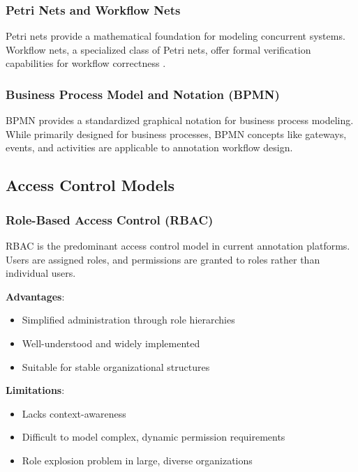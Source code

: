 \subsubsection{Petri Nets and Workflow Nets}

Petri nets \cite{petri1966communication} provide a mathematical foundation for modeling concurrent systems. Workflow nets, a specialized class of Petri nets, offer formal verification capabilities for workflow correctness \cite{aalst1998application}.

\subsubsection{Business Process Model and Notation (BPMN)}

BPMN \cite{bpmn2011} provides a standardized graphical notation for business process modeling. While primarily designed for business processes, BPMN concepts like gateways, events, and activities are applicable to annotation workflow design.

\subsection{Access Control Models}
\label{subsec:access-control}

\subsubsection{Role-Based Access Control (RBAC)}

RBAC \cite{sandhu1996role} is the predominant access control model in current annotation platforms. Users are assigned roles, and permissions are granted to roles rather than individual users.

\textbf{Advantages}:
\begin{itemize}
    \item Simplified administration through role hierarchies
    \item Well-understood and widely implemented
    \item Suitable for stable organizational structures
\end{itemize}

\textbf{Limitations}:
\begin{itemize}
    \item Lacks context-awareness
    \item Difficult to model complex, dynamic permission requirements
    \item Role explosion problem in large, diverse organizations
\end{itemize}

